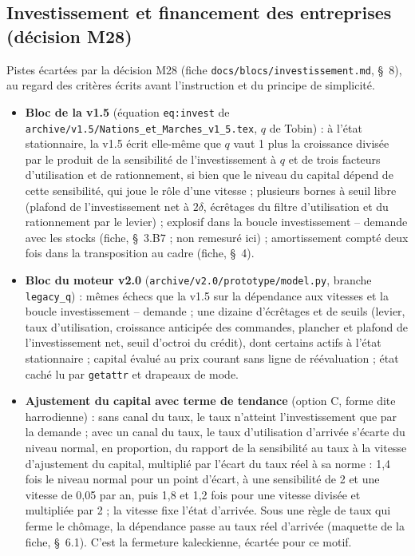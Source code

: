\documentclass[11pt,a4paper]{article}
\begin{document}
\subsection*{Investissement et financement des entreprises (décision M28)}
Pistes écartées par la décision M28 (fiche \nolinkurl{docs/blocs/investissement.md}, \S~8), au regard des critères écrits avant l'instruction et du principe de simplicité.
\begin{itemize}
\item \textbf{Bloc de la v1.5} (équation \texttt{eq:invest} de \nolinkurl{archive/v1.5/Nations_et_Marches_v1_5.tex}, $q$ de Tobin) : à l'état stationnaire, la v1.5 écrit elle-même que $q$ vaut 1 plus la croissance divisée par le produit de la sensibilité de l'investissement à $q$ et de trois facteurs d'utilisation et de rationnement, si bien que le niveau du capital dépend de cette sensibilité, qui joue le rôle d'une vitesse ; plusieurs bornes à seuil libre (plafond de l'investissement net à $2\delta$, écrêtages du filtre d'utilisation et du rationnement par le levier) ; explosif dans la boucle investissement -- demande avec les stocks (fiche, \S~3.B7 ; non remesuré ici) ; amortissement compté deux fois dans la transposition au cadre (fiche, \S~4).
\item \textbf{Bloc du moteur v2.0} (\texttt{archive/v2.0/prototype/model.py}, branche \texttt{legacy\_q}) : mêmes échecs que la v1.5 sur la dépendance aux vitesses et la boucle investissement -- demande ; une dizaine d'écrêtages et de seuils (levier, taux d'utilisation, croissance anticipée des commandes, plancher et plafond de l'investissement net, seuil d'octroi du crédit), dont certains actifs à l'état stationnaire ; capital évalué au prix courant sans ligne de réévaluation ; état caché lu par \texttt{getattr} et drapeaux de mode.
\item \textbf{Ajustement du capital avec terme de tendance} (option C, forme dite harrodienne) : sans canal du taux, le taux n'atteint l'investissement que par la demande ; avec un canal du taux, le taux d'utilisation d'arrivée s'écarte du niveau normal, en proportion, du rapport de la sensibilité au taux à la vitesse d'ajustement du capital, multiplié par l'écart du taux réel à sa norme : 1,4 fois le niveau normal pour un point d'écart, à une sensibilité de 2 et une vitesse de 0,05 par an, puis 1,8 et 1,2 fois pour une vitesse divisée et multipliée par 2 ; la vitesse fixe l'état d'arrivée. Sous une règle de taux qui ferme le chômage, la dépendance passe au taux réel d'arrivée (maquette de la fiche, \S~6.1). C'est la fermeture kaleckienne, écartée pour ce motif.

\end{itemize}
\end{document}
